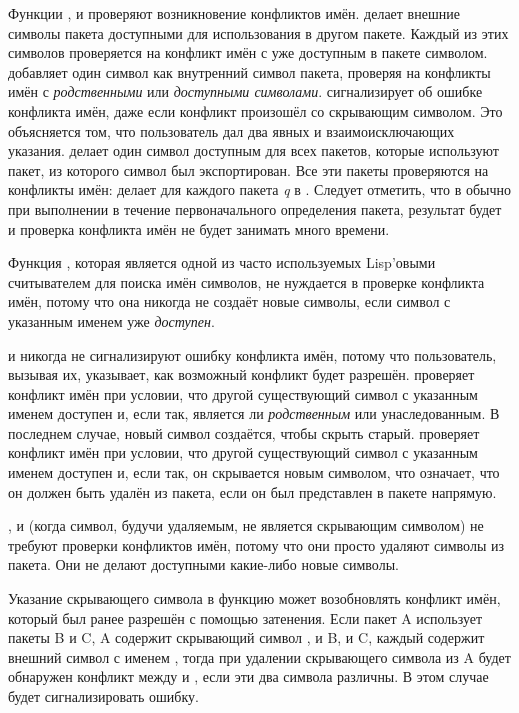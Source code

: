 Функции ,  и  проверяют возникновение
конфликтов имён.  делает внешние символы пакета доступными для
использования в другом пакете. Каждый из этих символов проверяется на конфликт
имён с уже доступным в пакете символом.
 добавляет один символ как внутренний символ пакета, проверяя на
конфликты имён с \emph{родственными} или \emph{доступными
 символами}.  сигнализирует об ошибке конфликта имён, даже если
конфликт произошёл со скрывающим символом. Это объясняется том, что пользователь
дал два явных и взаимоисключающих указания.
 делает один символ доступным для всех пакетов, которые используют
пакет, из которого символ был экспортирован. Все эти пакеты проверяются на
конфликты имён:  делает  для каждого пакета \emph{q} в
. Следует отметить, что в обычно при
выполнении  в течение первоначального определения пакета, результат
 будет {\false} и проверка конфликта имён не будет
занимать много времени.

Функция , которая является одной из часто используемых
Lisp'овыми считывателем для поиска имён символов, не нуждается в
проверке конфликта имён, потому что она никогда не создаёт новые
символы, если символ с указанным именем уже \emph{доступен}.

 и  никогда не сигнализируют ошибку конфликта
имён, потому что пользователь, вызывая их, указывает, как возможный конфликт
будет разрешён.  проверяет конфликт имён при условии, что другой
существующий символ с указанным именем доступен и, если так, является ли
\emph{родственным} или унаследованным. В последнем случае, новый символ
создаётся, чтобы скрыть старый.  проверяет конфликт
имён при условии, что другой существующий символ с указанным именем доступен и,
если так, он скрывается новым символом, что означает, что он должен быть
удалён из пакета, если он был представлен в пакете напрямую.

,  и  (когда символ, будучи
удаляемым, не является скрывающим символом) не требуют проверки
конфликтов имён, потому что они просто удаляют символы из пакета. Они не делают
доступными какие-либо новые символы.

Указание скрывающего символа в функцию  может
возобновлять конфликт имён, который был ранее разрешён с помощью
затенения. Если пакет A использует пакеты B и C, A содержит скрывающий
символ , и B, и C, каждый содержит внешний символ с именем
, тогда при удалении скрывающего символа  из A будет
обнаружен конфликт между  и , если эти два символа
различны. В этом случае  будет сигнализировать ошибку.

